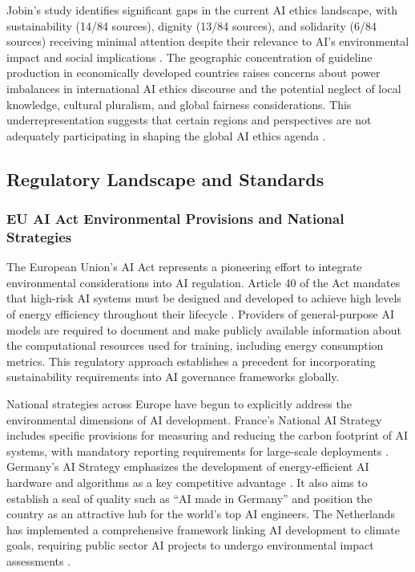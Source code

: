 \documentclass[twoside]{ai_ethics_class}
\begin{document}
Jobin's study identifies significant gaps in the current AI ethics landscape, with sustainability (14/84 sources), dignity (13/84 sources), and solidarity (6/84 sources) receiving minimal attention despite their relevance to AI's environmental impact and social implications \cite{jobin2019global}.
The geographic concentration of guideline production in economically developed countries raises concerns about power imbalances in international AI ethics discourse and the potential neglect of local knowledge, cultural pluralism, and global fairness considerations.
This underrepresentation suggests that certain regions and perspectives are not adequately participating in shaping the global AI ethics agenda \cite{jobin2019global}.

\subsection{Regulatory Landscape and Standards}

\subsubsection{EU AI Act Environmental Provisions and National Strategies}

The European Union's AI Act represents a pioneering effort to integrate environmental considerations into AI regulation.
Article 40 of the Act mandates that high-risk AI systems must be designed and developed to achieve high levels of energy efficiency throughout their lifecycle \cite{euaiact40}.
Providers of general-purpose AI models are required to document and make publicly available information about the computational resources used for training, including energy consumption metrics.
This regulatory approach establishes a precedent for incorporating sustainability requirements into AI governance frameworks globally.

National strategies across Europe have begun to explicitly address the environmental dimensions of AI development.
France's National AI Strategy includes specific provisions for measuring and reducing the carbon footprint of AI systems, with mandatory reporting requirements for large-scale deployments \cite{france2025ai}.
Germany's AI Strategy emphasizes the development of energy-efficient AI hardware and algorithms as a key competitive advantage \cite{germany2023ai}.
It also aims to establish a seal of quality such as ``AI made in Germany'' and position the country as an attractive hub for the world's top AI engineers.
The Netherlands has implemented a comprehensive framework linking AI development to climate goals, requiring public sector AI projects to undergo environmental impact assessments \cite{netherlands2019ai}.
\end{document}
